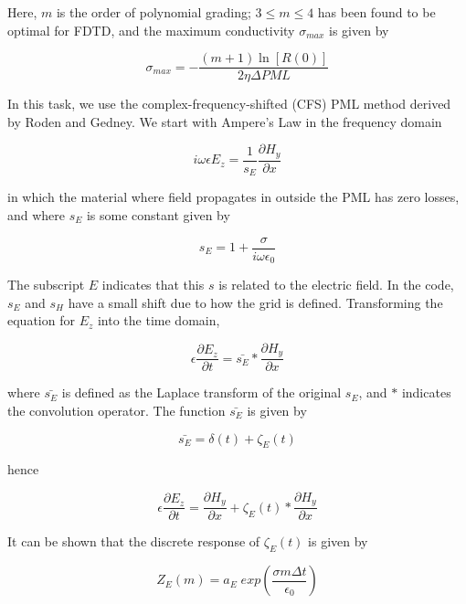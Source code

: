 \documentclass{article}
\begin{document}
Here, \(m\) is the order of polynomial grading; \(3 \leq m \leq 4\) has
been found to be optimal for FDTD, and the maximum conductivity
\(\sigma_{max}\) is given by

\begin{equation}
\sigma_{max} = -\dfrac{(m+1) \ln[R(0)]}{2\eta \Delta PML}
\end{equation}

    In this task, we use the complex-frequency-shifted (CFS) PML method
derived by Roden and Gedney. We start with Ampere's Law in the frequency
domain

\begin{equation}
i \omega \epsilon E_z = \dfrac{1}{s_E} \dfrac{\partial H_y}{\partial x}
\end{equation}

in which the material where field propagates in outside the PML has zero
losses, and where \(s_E\) is some constant given by

\begin{equation}
s_E = 1 + \dfrac{\sigma}{i \omega \epsilon_0}
\end{equation}

The subscript \(E\) indicates that this \(s\) is related to the electric
field. In the code, \(s_E\) and \(s_H\) have a small shift due to how
the grid is defined. Transforming the equation for \(E_z\) into the time
domain,

\begin{equation}
\epsilon \dfrac{\partial E_z}{\partial t} = \bar{s_E} * \dfrac{\partial H_y}{\partial x}
\end{equation}

where \(\bar{s_E}\) is defined as the Laplace transform of the original
\(s_E\), and \(*\) indicates the convolution operator. The function
\(\bar{s_E}\) is given by

\begin{equation}
\bar{s_E} = \delta(t) + \zeta_E(t)
\end{equation}

hence

\begin{equation}
\epsilon \dfrac{\partial E_z}{\partial t} = \dfrac{\partial H_y}{\partial x} + \zeta_E(t) * \dfrac{\partial H_y}{\partial x}
\end{equation}

    It can be shown that the discrete response of \(\zeta_E (t)\) is given
by

\begin{equation}
Z_E (m) = a_E \; exp\left( \dfrac{\sigma m \Delta t}{\epsilon_0} \right)
\end{equation}
\end{document}
